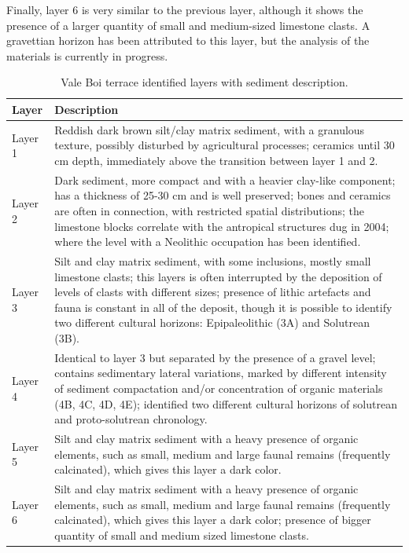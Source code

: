 \documentclass[12pt,twoside]{reedthesis}
\begin{document}
Finally, layer 6 is very similar to the previous layer, although it shows the presence of a larger quantity of small and medium-sized limestone clasts. A gravettian horizon has been attributed to this layer, but the analysis of the materials is currently in progress.
~
\begin{table}[!h]

\caption{\label{tab:vbstrat}Vale Boi terrace identified layers with sediment description.}
\centering
\fontsize{9}{11}\selectfont
\begin{tabular}[t]{>{\raggedright\arraybackslash}p{2cm}>{\raggedright\arraybackslash}p{12cm}}
\toprule
Layer & Description\\
\midrule
Layer 1 & Reddish dark brown silt/clay matrix sediment, with a granulous texture, possibly disturbed by agricultural processes; ceramics until 30 cm depth, immediately above the transition between layer 1 and 2.\\
Layer 2 & Dark sediment, more compact and with a heavier clay-like component; has a thickness of 25-30 cm and is well preserved; bones and ceramics are often in connection, with restricted spatial distributions; the limestone blocks correlate with the antropical structures dug in 2004; where the level with a Neolithic occupation has been identified.\\
Layer 3 & Silt and clay matrix sediment, with some inclusions, mostly small limestone clasts; this layers is often interrupted by the deposition of levels of clasts with different sizes; presence of lithic artefacts and fauna is constant in all of the deposit, though it is possible to identify two different cultural horizons: Epipaleolithic (3A) and Solutrean (3B).\\
Layer 4 & Identical to layer 3 but separated by the presence of a gravel level; contains sedimentary lateral variations, marked by different intensity of sediment compactation and/or concentration of organic materials (4B, 4C, 4D, 4E); identified two different cultural horizons of solutrean and proto-solutrean chronology.\\
Layer 5 & Silt and clay matrix sediment with a heavy presence of organic elements, such as small, medium and large faunal remains (frequently calcinated), which gives this layer a dark color.\\
\addlinespace
Layer 6 & Silt and clay matrix sediment with a heavy presence of organic elements, such as small, medium and large faunal remains (frequently calcinated), which gives this layer a dark color; presence of bigger quantity of small and medium sized limestone clasts.\\
\bottomrule
\end{tabular}
\end{table}
~
\end{document}
